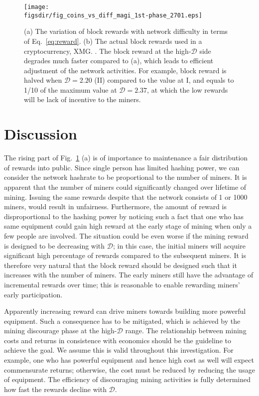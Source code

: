 \documentclass[aps,prl,reprint,showpacs,groupedaddress,letterpaper]{revtex4-1}
\def\figsdir{.}
\begin{document}
\begin{figure}[!h]
\texttt{[image: \\figsdir/fig\_coins\_vs\_diff\_magi\_1st-phase\_2701.eps]}
\caption{\label{fig:rewards} (a) The variation of block rewards with network difficulty in terms of Eq.~\ref{eq:reward}. (b) The actual block rewards used in a cryptocurrency, XMG. \cite{Magi.url}. The block reward at the high-$\mathcal{D}$ side degrades much faster compared to (a), which leads to efficient adjustment of the network activities. For example, block reward is halved when $\mathcal{D}=2.20$ (II) compared to the value at I, and equals to 1/10 of the maximum value at $\mathcal{D}=2.37$, at which the low rewards will be lack of incentive to the miners. }
\end{figure}

\section{Discussion}

The rising part of Fig.~\ref{fig:rewards} (a) is of importance to maintenance a fair distribution of rewards into public. Since single person has limited hashing power, we can consider the network hashrate to be proportional to the number of miners. It is apparent that the number of miners could significantly changed over lifetime of mining. Issuing the same rewards despite that the network consists of 1 or 1000 miners, would result in unfairness. Furthermore, the amount of reward is disproportional to the hashing power by noticing such a fact that one who has same equipment could gain high reward at the early stage of mining when only a few people are involved. The situation could be even worse if the mining reward is designed to be decreasing with $\mathcal{D}$; in this case, the initial miners will acquire significant high percentage of rewards compared to the subsequent miners. It is therefore very natural that the block reward should be designed such that it increases with the number of miners. The early miners still have the advantage of incremental rewards over time; this is reasonable to enable rewarding miners' early participation. 

Apparently increasing reward can drive miners towards building more powerful equipment. Such a consequence has to be mitigated, which is achieved by the mining discourage phase at the high-$\mathcal{D}$ range. The relationship between mining costs and returns in consistence with economics should be the guideline to achieve the goal. We assume this is valid throughout this investigation. For example, one who has powerful equipment and hence high cost as well will expect commensurate returns; otherwise, the cost must be reduced by reducing the usage of equipment. The efficiency of discouraging mining activities is fully determined how fast the rewards decline with $\mathcal{D}$. 
\end{document}
